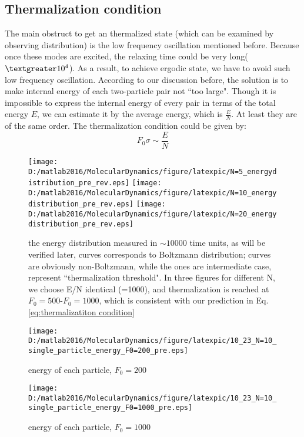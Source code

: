 \documentclass[aps,pre,twocolumn,groupedaddress]{revtex4-1}
\begin{document}
\subsection{Thermalization condition}
The main obstruct to get an thermalized state (which can be examined by observing distribution) is the low frequency oscillation mentioned before. Because once these modes are excited, the relaxing time could be very long($\textgreater 10^4$). As a result, to achieve ergodic state, we have to avoid such low frequency oscillation. According to our discussion before, the solution is to make internal energy of each two-particle pair not ``too large". Though it is impossible to express the internal energy of every pair in terms of the total energy $E$, we can estimate it by the average energy, which is $\frac{E}{N}$. At least they are of the same order. The thermalization condition could be given by:
\begin{equation}
F_0\sigma\sim\frac{E}{N}
\label{eq:thermalizatiton condition}
\end{equation}



\begin{figure}[hbtp]
\centering
\texttt{[image: D:/matlab2016/MolecularDynamics/figure/latexpic/N=5\_energydistribution\_pre\_rev.eps]} 
\texttt{[image: D:/matlab2016/MolecularDynamics/figure/latexpic/N=10\_energydistribution\_pre\_rev.eps]} 
\texttt{[image: D:/matlab2016/MolecularDynamics/figure/latexpic/N=20\_energydistribution\_pre\_rev.eps]}
\caption{the energy distribution measured in $\sim 10000$ time units, as will be verified later, {\color{green}{green}} curves corresponds to Boltzmann distribution; {\color{red}{red}} curves are obviously non-Boltzmann, while the {\color{yellow}{yellow}} ones are intermediate case, represent ``thermalization threshold". In three figures for different N, we choose E/N identical (=1000), and thermalization is reached at $F_0=500$-$F_0=1000$, which is consistent with our prediction in Eq.\ref{eq:thermalizatiton condition}}
\label{fig:thermalization5}

\end{figure}




\begin{figure}
\texttt{[image: D:/matlab2016/MolecularDynamics/figure/latexpic/10\_23\_N=10\_single\_particle\_energy\_F0=200\_pre.eps]} 
\caption{energy of each particle, $F_0=200$}
\label{fig:thermalization6}

\texttt{[image: D:/matlab2016/MolecularDynamics/figure/latexpic/10\_23\_N=10\_single\_particle\_energy\_F0=1000\_pre.eps]} 
\caption{energy of each particle, $F_0=1000$}
\label{fig:thermalization7}
\end{figure}
\end{document}
